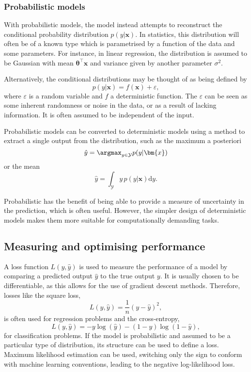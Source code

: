 \subsubsection{Probabilistic models}
With probabilistic models, the model instead attempts to reconstruct the conditional probability distribution $p(y|\bm{x})$.
In statistics, this distribution will often be of a known type which is parametrised by a function of the data and some parameters.
For instance, in linear regression, the distribution is assumed to be Gaussian with mean $\bm{\theta}^\top\bm{x}$ and variance given by another parameter $\sigma^2$.

Alternatively, the conditional distributions may be thought of as being defined by
\begin{equation}
    p(y|\bm{x}) = f(\bm{x}) + \varepsilon,
    \label{eq:probabilistic_model}
\end{equation}
where $\varepsilon$ is a random variable and $f$ a deterministic function.
The $\varepsilon$ can be seen as some inherent randomness or noise in the data, or as a result of lacking information.
It is often assumed to be independent of the input.

Probabilistic models can be converted to deterministic models using a method to extract a single output from the distribution, such as the maximum a posteriori
\begin{equation}
    \hat{y} = \argmax_{y\in\mathcal{Y}} p(y|\bm{x})
\end{equation}
or the mean
\begin{equation}
    \hat{y} = \int_{\mathcal{Y}} y \, p(y|\bm{x})\mathrm{d}y.
\end{equation}

Probabilistic has the benefit of being able to provide a measure of uncertainty in the prediction, which is often useful.
However, the simpler design of deterministic models makes them more suitable for computationally demanding tasks.

\subsection{Measuring and optimising performance}
A loss function $L(y, \hat{y})$ is used to measure the performance of a model by comparing a predicted output $\hat{y}$ to the true output $y$.
It is usually chosen to be differentiable, as this allows for the use of gradient descent methods.
Therefore, losses like the square loss,
\begin{equation}
    L(y, \hat{y}) = \frac{1}{n} (y - \hat{y})^2,
\end{equation}
is often used for regression problems and the cross-entropy,
\begin{equation}
    L(y, \hat{y}) = -y\log(\hat{y}) - (1-y)\log(1-\hat{y}),
\end{equation}
for classification problems.
If the model is probabilistic and assumed to be a particular type of distribution, its structure can be used to define a loss.
Maximum likelihood estimation can be used, switching only the sign to conform with machine learning conventions, leading to the negative log-likelihood loss.

